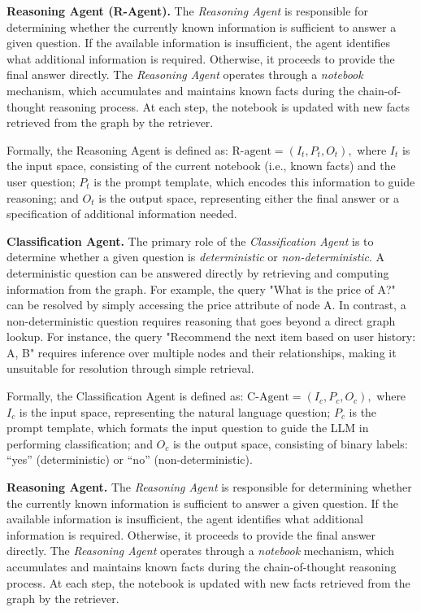 \textbf{Reasoning Agent (R-Agent).}
The \textit{Reasoning Agent} is responsible for determining whether the currently known information is sufficient to answer a given question. If the available information is insufficient, the agent identifies what additional information is required. Otherwise, it proceeds to provide the final answer directly. The \textit{Reasoning Agent} operates through a \textit{notebook} mechanism, which accumulates and maintains known facts during the chain-of-thought reasoning process. At each step, the notebook is updated with new facts retrieved from the graph by the retriever.

Formally, the Reasoning Agent is defined as:
$
\text{R-agent} = (I_t, P_t, O_t),
$
where $I_t$ is the input space, consisting of the current notebook (i.e., known facts) and the user question; \( P_t \) is the prompt template, which encodes this information to guide reasoning; and \( O_t \) is the output space, representing either the final answer or a specification of additional information needed.

\iffalse
\textbf{Classification Agent.}
The primary role of the \textit{Classification Agent} is to determine whether a given question is \textit{deterministic} or \textit{non-deterministic}. A deterministic question can be answered directly by retrieving and computing information from the graph. For example, the query "What is the price of A?" can be resolved by simply accessing the price attribute of node A. In contrast, a non-deterministic question requires reasoning that goes beyond a direct graph lookup. For instance, the query "Recommend the next item based on user history: A, B" requires inference over multiple nodes and their relationships, making it unsuitable for resolution through simple retrieval.

Formally, the Classification Agent is defined as:
$
\text{C-Agent} = (I_c, P_c, O_c),
$
where $I_c$ is the input space, representing the natural language question; \( P_c \) is the prompt template, which formats the input question to guide the LLM in performing classification; and \( O_c \) is the output space, consisting of binary labels: ``yes'' (deterministic) or ``no'' (non-deterministic).


\textbf{Reasoning Agent.}
The \textit{Reasoning Agent} is responsible for determining whether the currently known information is sufficient to answer a given question. If the available information is insufficient, the agent identifies what additional information is required. Otherwise, it proceeds to provide the final answer directly. The \textit{Reasoning Agent} operates through a \textit{notebook} mechanism, which accumulates and maintains known facts during the chain-of-thought reasoning process. At each step, the notebook is updated with new facts retrieved from the graph by the retriever.

